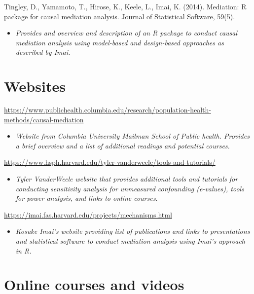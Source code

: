 \documentclass[
]{book}
\providecommand{\tightlist}{%
  \setlength{\itemsep}{0pt}\setlength{\parskip}{0pt}}
\begin{document}
Tingley, D., Yamamoto, T., Hirose, K., Keele, L., Imai, K. (2014). Mediation: R package for causal mediation analysis. Journal of Statistical Software, 59(5).

\begin{itemize}
\tightlist
\item
  \emph{Provides and overview and description of an R package to conduct causal mediation analysis using model-based and design-based approaches as described by Imai.}
\end{itemize}

\hypertarget{websites-3}{%
\section{Websites}\label{websites-3}}

\url{https://www.publichealth.columbia.edu/research/population-health-methods/causal-mediation}

\begin{itemize}
\tightlist
\item
  \emph{Website from Columbia University Mailman School of Public health. Provides a brief overview and a list of additional readings and potential courses.}
\end{itemize}

\url{https://www.hsph.harvard.edu/tyler-vanderweele/tools-and-tutorials/}

\begin{itemize}
\tightlist
\item
  \emph{Tyler VanderWeele website that provides additional tools and tutorials for conducting sensitivity analysis for unmeasured confounding (e-values), tools for power analysis, and links to online courses}.
\end{itemize}

\url{https://imai.fas.harvard.edu/projects/mechanisms.html}

\begin{itemize}
\tightlist
\item
  \emph{Kosuke Imai's website providing list of publications and links to presentations and statistical software to conduct mediation analysis using Imai's approach in R.}
\end{itemize}

\hypertarget{online-courses-and-videos-2}{%
\section{Online courses and videos}\label{online-courses-and-videos-2}}
\end{document}

